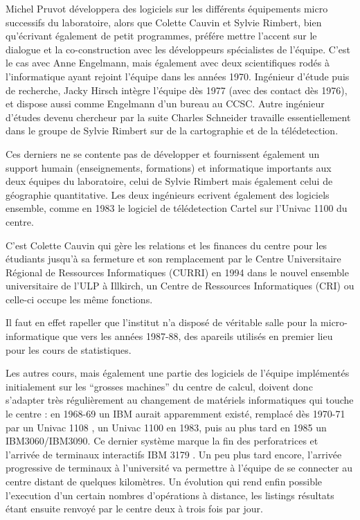 Michel Pruvot développera des logiciels sur les différents équipements micro successifs du laboratoire, alors que Colette Cauvin et Sylvie Rimbert, bien qu'écrivant également de petit programmes, préfére mettre l'accent sur le dialogue et la co-construction avec les développeurs spécialistes de l'équipe. C'est le cas avec Anne Engelmann, mais également avec deux scientifiques rodés à l'informatique ayant rejoint l'équipe dans les années 1970. Ingénieur d'étude puis de recherche, Jacky Hirsch intègre l'équipe dès 1977 (avec des contact dès 1976), et dispose aussi comme Engelmann d'un bureau au CCSC. Autre ingénieur d'études devenu chercheur par la suite Charles Schneider travaille essentiellement dans le groupe de Sylvie Rimbert sur de la cartographie et de la télédetection.

Ces derniers ne se contente pas de développer et fournissent également un support humain (enseignements, formations) et informatique importants aux deux équipes du laboratoire, celui de Sylvie Rimbert mais également celui de géographie quantitative. Les deux ingénieurs ecrivent également des logiciels ensemble, comme en 1983 le logiciel de télédetection Cartel sur l'Univac 1100 du centre.

C'est Colette Cauvin qui gère les relations et les finances du centre pour les étudiants jusqu'à sa fermeture et son remplacement par le Centre Universitaire Régional de Ressources Informatiques (CURRI) en 1994 dans le nouvel ensemble universitaire de l'ULP à Illkirch, un Centre de Ressources Informatiques (CRI) ou celle-ci occupe les même fonctions.

Il faut en effet rapeller que l'institut n'a disposé de véritable salle pour la micro-informatique que vers les années 1987-88, des apareils utilisés en premier lieu pour les cours de statistiques.

Les autres cours, mais également une partie des logiciels de l'équipe implémentés initialement sur les \enquote{grosses machines} du centre de calcul, doivent donc s'adapter très régulièrement au changement de matériels informatiques qui touche le centre : en 1968-69 un IBM aurait apparemment existé, remplacé dès 1970-71 par un Univac 1108 \textcite{Dalmasso1971}, un Univac 1100 en 1983, puis au plus tard en 1985 un IBM3060/IBM3090. Ce dernier système marque la fin des perforatrices et l'arrivée de terminaux interactifs IBM 3179 \autocites{Rimbert1984,Cauvin1986}. Un peu plus tard encore, l'arrivée progressive de terminaux à l'université va permettre à l'équipe de se connecter au centre distant de quelques kilomètres. Un évolution qui rend enfin possible l'execution d'un certain nombres d'opérations à distance, les listings résultats étant ensuite renvoyé par le centre deux à trois fois par jour.

